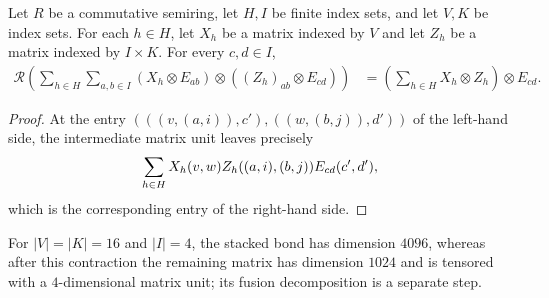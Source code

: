 \begin{lemma}
    \label{thm:asymex_matrix_unit_register_contraction}
    \leanok
    Let $R$ be a commutative semiring, let $H,I$ be finite index
    sets, and let $V,K$ be index sets. For each $h\in H$, let $X_h$
    be a matrix indexed by $V$ and let $Z_h$ be a matrix indexed by
    $I\times K$. For every $c,d\in I$,
    \begin{align}
        \mathcal R\left(
        \sum_{h\in H}\sum_{a,b\in I}
            (X_h\otimes E_{ab})\otimes({(Z_h)}_{ab}\otimes E_{cd})
        \right)
         & =\left(\sum_{h\in H}X_h\otimes Z_h\right)\otimes E_{cd}.
        \label{eq:asymex_matrix_unit_register_contraction}
    \end{align}
\end{lemma}

\begin{proof}\leanok
    At the entry $(((v,(a,i)),c'),((w,(b,j)),d'))$ of the left-hand side,
    the intermediate matrix unit leaves precisely
    \begin{align}
        \sum_{h\in H}X_h(v,w)Z_h((a,i),(b,j))E_{cd}(c',d'),
        \notag
    \end{align}
    which is the corresponding entry of the right-hand side.
\end{proof}

For $|V|=|K|=16$ and $|I|=4$, the stacked bond has dimension $4096$,
whereas after this contraction the remaining matrix has dimension $1024$
and is tensored with a $4$-dimensional matrix unit; its fusion
decomposition is a separate step.
